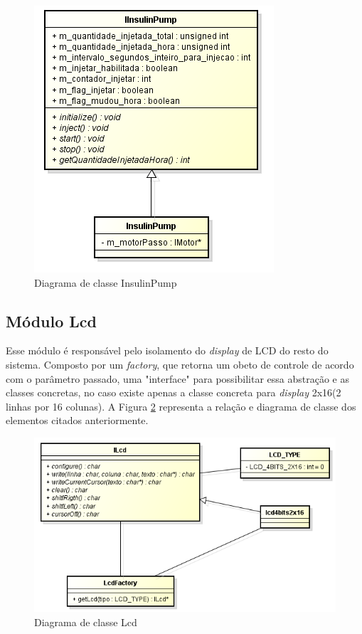 \begin{figure}[htp]
	\centering
	\includegraphics[scale=1]{images/classe_insulinpump.png}
	\caption{Diagrama de classe InsulinPump}	
	\label{fig:diagramainsulinpump}
\end{figure}

\subsection{Módulo Lcd}

Esse módulo é responsável pelo isolamento do \emph{display} de LCD do resto do sistema. Composto por um \emph{factory}, que retorna um obeto de controle de acordo com o parâmetro passado, uma "interface" para possibilitar essa abstração e as classes concretas, no caso existe apenas a classe concreta para \emph{display} 2x16(2 linhas por 16 colunas). A Figura \ref{fig:diagramalcd} representa a relação e diagrama de classe dos elementos citados anteriormente.

\begin{figure}[htp]
	\centering
	\includegraphics[scale=0.8]{images/classe_lcd.png}
	\caption{Diagrama de classe Lcd}	
	\label{fig:diagramalcd}
\end{figure}


